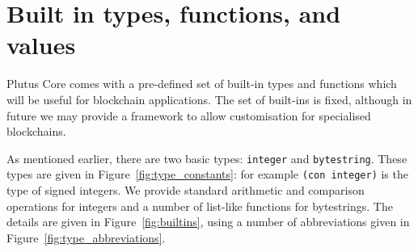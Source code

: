 \documentclass[a4paper]{article}
\begin{document}
\section{Built in types, functions, and values}
\label{sec:builtins}
Plutus Core comes with a pre-defined set of built-in types and
functions which will be useful for blockchain applications.  The set
of built-ins is fixed, although in future we may provide a framework
to allow customisation for specialised blockchains.

As mentioned earlier, there are two basic types: \texttt{integer} and
\texttt{bytestring}.  These types are given in
Figure~\ref{fig:type_constants}: for example \texttt{(con
  integer)} is the type of signed integers.
We provide standard arithmetic and comparison operations for integers
and a number of list-like functions for bytestrings. The details are
given in Figure~\ref{fig:builtins}, using a number of
abbreviations given in Figure~\ref{fig:type_abbreviations}.
\end{document}

